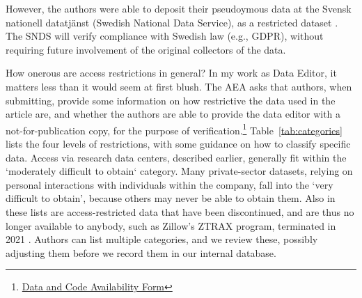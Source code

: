 \documentclass{article}
\begin{document}
%
%
However, the authors were able to deposit their pseudoymous data at the Svensk nationell datatjänst (Swedish National Data Service), as a restricted dataset \citep{ahrsjo_data_2023}. The SNDS will verify compliance with Swedish law (e.g., \ac{GDPR}), without requiring future involvement of the original collectors of the data. 

How onerous are access restrictions in general? In my work as Data Editor, it matters less than it would seem at first blush. The AEA asks that authors, when submitting, provide some information on how restrictive the data used in the article are, and whether the authors are able to provide the data editor with a not-for-publication copy, for the purpose of verification.\footnote{\href{https://www.aeaweb.org/journals/forms/data-code-availability}{Data and Code Availability Form}} Table~\ref{tab:categories} lists the four levels of restrictions, with some guidance on how to classify specific data. Access via research data centers, described earlier, generally fit within the `moderately difficult to obtain` category. Many private-sector datasets, relying on personal interactions with individuals within the company, fall into the `very difficult to obtain', because others may never be able to obtain them. Also in these lists are access-restricted data that have been discontinued, and are thus no longer available to anybody, such as Zillow's  ZTRAX program, terminated in 2021 \citep{zillow_zillows_2021}. Authors can list multiple categories, and we review these, possibly adjusting them before we record them in our internal database. 
\end{document}
